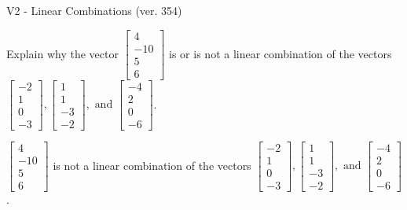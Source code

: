 \begin{exercise}
  \begin{exerciseTitle}V2 - Linear Combinations (ver. 354)\end{exerciseTitle}
  \begin{exerciseStatement}
    Explain why the vector \(\left[\begin{array}{c}
4 \\
-10 \\
5 \\
6
\end{array}\right]\)  is or is not a linear 
	combination of the vectors \(\left[\begin{array}{c}
-2 \\
1 \\
0 \\
-3
\end{array}\right] , \left[\begin{array}{c}
1 \\
1 \\
-3 \\
-2
\end{array}\right] , \text{ and } \left[\begin{array}{c}
-4 \\
2 \\
0 \\
-6
\end{array}\right]\).
	


  \end{exerciseStatement}
  \begin{exerciseAnswer}
   \(\left[\begin{array}{c}
4 \\
-10 \\
5 \\
6
\end{array}\right]\) 
  	 is not  
	a linear combination of the vectors \(\left[\begin{array}{c}
-2 \\
1 \\
0 \\
-3
\end{array}\right] , \left[\begin{array}{c}
1 \\
1 \\
-3 \\
-2
\end{array}\right] , \text{ and } \left[\begin{array}{c}
-4 \\
2 \\
0 \\
-6
\end{array}\right]\).

	
  


  \end{exerciseAnswer}
\end{exercise}